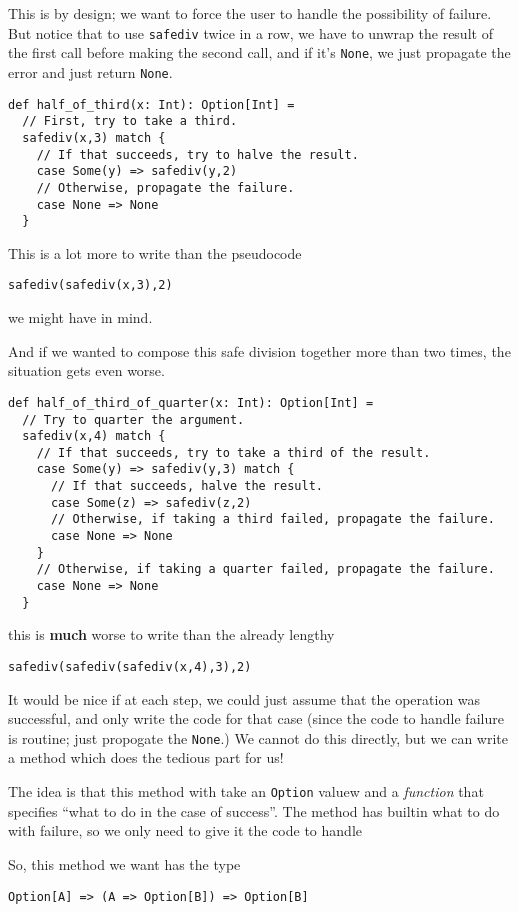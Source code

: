 \documentclass[11pt]{article}
\begin{document}
This is by design; we want to force the user to handle
the possibility of failure.
But notice that to use \texttt{safediv} twice in a row, we have to unwrap
the result of the first call before making the second call,
and if it's \texttt{None}, we just propagate the error
and just return \texttt{None}.
\begin{verbatim}
def half_of_third(x: Int): Option[Int] =
  // First, try to take a third.
  safediv(x,3) match {
    // If that succeeds, try to halve the result.
    case Some(y) => safediv(y,2)
    // Otherwise, propagate the failure.
    case None => None
  }
\end{verbatim}
This is a lot more to write than the pseudocode
\begin{verbatim}
safediv(safediv(x,3),2)
\end{verbatim}
we might have in mind.

And if we wanted to compose this safe division together
more than two times, the situation gets even worse.
\begin{verbatim}
def half_of_third_of_quarter(x: Int): Option[Int] =
  // Try to quarter the argument.
  safediv(x,4) match {
    // If that succeeds, try to take a third of the result.
    case Some(y) => safediv(y,3) match {
      // If that succeeds, halve the result.
      case Some(z) => safediv(z,2)
      // Otherwise, if taking a third failed, propagate the failure.
      case None => None
    }
    // Otherwise, if taking a quarter failed, propagate the failure.
    case None => None
  }
\end{verbatim}

this is \textbf{much} worse to write than the already lengthy
\begin{verbatim}
safediv(safediv(safediv(x,4),3),2)
\end{verbatim}

It would be nice if at each step, we could just assume that the
operation was successful, and only write the code
for that case (since the code to handle failure is routine;
just propogate the \texttt{None}.)
We cannot do this directly, but we can write a method
which does the tedious part for us! 

The idea is that this method with take an \texttt{Option} valuew
and a \emph{function} that specifies “what to do in the case of success”.
The method has builtin what to do with failure,
so we only need to give it the code to handle

So, this method we want has the type
\begin{verbatim}
Option[A] => (A => Option[B]) => Option[B]
\end{verbatim}
\end{document}

